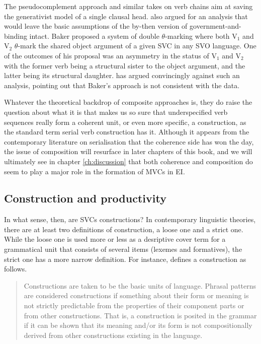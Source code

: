 The pseudocomplement approach and similar takes on verb chains aim at saving the generativist model of a single clausal head. \citet{baker1989object} also argued for an analysis that would leave the basic assumptions of the by-then version of government-and-binding intact. Baker proposed a system of double $\theta$-marking where both V$_1$ and V$_2$ $\theta$-mark the shared object argument of a given SVC in any SVO language. One of the outcomes of his proposal was an asymmetry in the status of V$_1$ and V$_2$ with the former verb being a structural sister to the object argument, and the latter being its structural daughter. \citet{Durie1997} has argued convincingly against such an analysis, pointing out that Baker's approach is not consistent with the data.

Whatever the theoretical backdrop of composite approaches is, they do raise the question about what it is that makes us so sure that underspecified verb sequences really form a coherent unit, or even more specific, a construction, as the standard term serial verb construction has it. Although it appears from the contemporary literature on serialisation that the coherence side has won the day, the issue of composition will resurface in later chapters of this book, and we will ultimately see in chapter \ref{ch:discussion} that both coherence and composition do seem to play a major role in the formation of MVCs in EI.

\subsection{Construction and productivity}\label{sec:construction}

In what sense, then, are SVCs constructions? In contemporary linguistic theories, there are at least two definitions of construction, a loose one and a strict one. While the loose one is used more or less as a desriptive cover term for a grammatical unit that consists of several items (lexemes and formatives), the strict one has a more narrow definition. For instance, \citet[4]{goldberg1995constructions} defines a construction as follows. 

\begin{quote}Constructions are taken to be the basic units of language. Phrasal patterns are considered constructions if something about their form or meaning is not strictly predictable from the properties of their component parts or from other constructions. That is, a construction is posited in the grammar if it can be shown that its meaning and/or its form is not compositionally derived from other constructions existing in the language.\end{quote}

